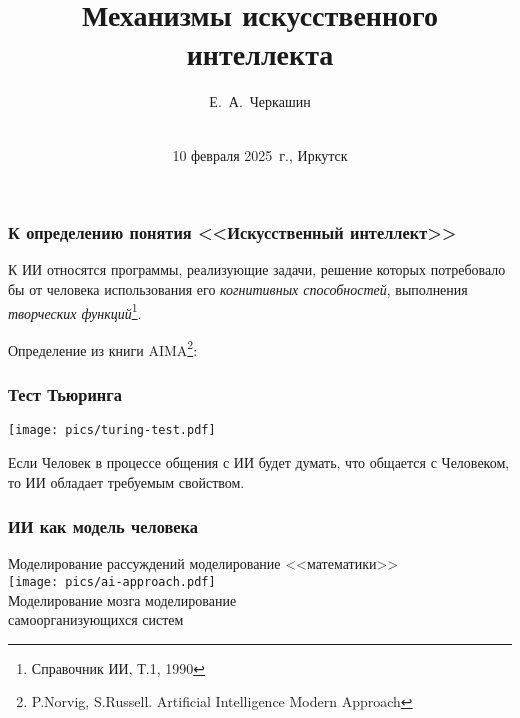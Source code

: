 \documentclass[10pt]{beamer}
\begin{document}
\setlength{\parindent}{1em}
\title{Механизмы искусственного интеллекта}

\author{Е.~А.~Черкашин}
\date[10.02.2025]{{}\\[1.5cm]
10 февраля 2025~г., Иркутск
}
\maketitle

\begin{frame}[fragile]
  \frametitle{К определению понятия <<Искусственный интеллект>>}

  К ИИ относятся программы, реализующие задачи, решение которых потребовало бы от человека использования его \emph{когнитивных способностей}, выполнения \emph{творческих функций}\footnote{Справочник ИИ, Т.1, 1990}.

  \vspace{1em}

  Определение из книги AIMA\footnote{P.Norvig, S.Russell. Artificial Intelligence Modern Approach}:
  \begin{center}
  \end{center}
\end{frame}

\begin{frame}
  \frametitle{Тест Тьюринга}
  \begin{center}
    \texttt{[image: pics/turing-test.pdf]}
  \end{center}

  Если Человек в процессе общения с ИИ будет думать, что общается с Человеком, то ИИ обладает требуемым свойством.
\end{frame}


\begin{frame}
  \frametitle{ИИ как модель человека}
  \begin{center}
    Моделирование рассуждений \to{} моделирование <<математики>>\\
    \texttt{[image: pics/ai-approach.pdf]}\\
    Моделирование мозга \to{} моделирование\\ самоорганизующихся систем
  \end{center}
\end{frame}
\end{document}

